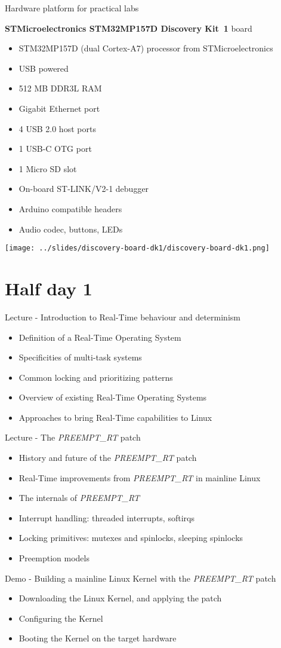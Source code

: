 \documentclass[a4paper,12pt,obeyspaces,spaces,hyphens]{article}
\begin{document}
\feagendatwocolumn
{Hardware platform for practical labs}
{
  {\bf STMicroelectronics STM32MP157D Discovery Kit~1} board
  \begin{itemize}
  \item STM32MP157D (dual Cortex-A7) processor from STMicroelectronics
  \item USB powered
  \item 512 MB DDR3L RAM
  \item Gigabit Ethernet port
  \item 4 USB 2.0 host ports
  \item 1 USB-C OTG port
  \item 1 Micro SD slot
  \item On-board ST-LINK/V2-1 debugger
  \item Arduino compatible headers
  \item Audio codec, buttons, LEDs
  \end{itemize}
}
{}
{
  \begin{center}
    \texttt{[image: ../slides/discovery-board-dk1/discovery-board-dk1.png]}
  \end{center}
}

\section{Half day 1}

\feagendaonecolumn
{Lecture - Introduction to Real-Time behaviour and determinism}
{
  \begin{itemize}
  \item Definition of a Real-Time Operating System
  \item Specificities of multi-task systems
  \item Common locking and prioritizing patterns
  \item Overview of existing Real-Time Operating Systems
  \item Approaches to bring Real-Time capabilities to Linux
  \end{itemize}
}

\feagendatwocolumn
{Lecture - The {\em PREEMPT\_RT} patch}
{
  \begin{itemize}
  \item History and future of the {\em PREEMPT\_RT} patch
  \item Real-Time improvements from {\em PREEMPT\_RT} in mainline Linux
  \item The internals of {\em PREEMPT\_RT}
  \item Interrupt handling: threaded interrupts, softirqs
  \item Locking primitives: mutexes and spinlocks, sleeping spinlocks
  \item Preemption models
  \end{itemize}
}
{Demo - Building a mainline Linux Kernel with the {\em PREEMPT\_RT} patch}
{
  \begin{itemize}
  \item Downloading the Linux Kernel, and applying the patch
  \item Configuring the Kernel
  \item Booting the Kernel on the target hardware
 \end{itemize}
}
\end{document}
